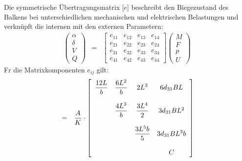 

Die symmetrische Übertragungsmatrix [$e$] beschreibt den Biegezustand
des Balkens bei unterschiedlichen mechanischen und elektrischen
Belastungen und verknüpft die internen mit den externen Parametern:
%
\begin{eqnarray}
  \left(
  \begin{array}{c}
  \alpha \\ \delta \\ V \\ Q
  \end{array} \right) & = &
  \left[
  \begin{array}{llll}
  e_{11} & e_{12} & e_{13} & e_{14} \\
  e_{21} & e_{22} & e_{23} & e_{24} \\
  e_{31} & e_{32} & e_{33} & e_{34} \\
  e_{41} & e_{42} & e_{43} & e_{44}
  \end{array}
 \right]
 \left(
 \begin{array}{c}
 M \\ F \\ p \\ U
 \end{array}
\right)
\end{eqnarray}
%
Fr die Matrixkomponenten $e_{ij}$ gilt:
%
\begin{eqnarray}
[ e ] & = & \frac{A}{K} \cdot
\left [
\begin{array}{cccc}
\displaystyle \frac{12L}{b} &   \displaystyle \frac{6L^{2}}{b} &
\displaystyle 2L^{3}        &   6d_{31}BL \\
\\
\displaystyle               &   \displaystyle \frac{4L^{3}}{b} &
\displaystyle \frac{3L^{4}}{2}            &   3d_{31}BL^{2} \\
\\
 &  & \displaystyle \frac{3L^{5}b}{5} & 3d_{31}BL^{3}b \\
\\
 & & & C
\end{array} \right ]
\end{eqnarray}

